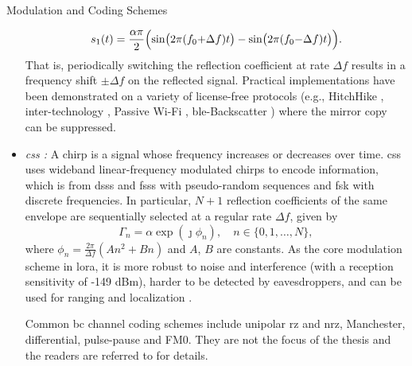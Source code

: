 \begin{section}{}
\begin{subsection}{Modulation and Coding Schemes}
\begin{itemize}
			\begin{equation}
				s_1(t) = \frac{\alpha \pi}{2} \Bigl(\sin\bigl(2 \pi (f_0 {+} \Delta f) t\bigr) - \sin\bigl(2 \pi (f_0 {-} \Delta f) t\bigr)\Bigr).
			\end{equation}
			That is, periodically switching the reflection coefficient at rate $\Delta f$ results in a frequency shift $\pm \Delta f$ on the reflected signal.
			Practical implementations have been demonstrated on a variety of license-free protocols (e.g., HitchHike \cite{Zhang2016a}, inter-technology \cite{Iyer2016}, Passive Wi-Fi \cite{Kellogg2017}, \gls{ble}-Backscatter \cite{Ensworth2017}) where the mirror copy can be suppressed.
			\item \emph{\gls{css} \cite{Talla2017}:} A chirp is a signal whose frequency increases or decreases over time.
			\gls{css} uses wideband linear-frequency modulated chirps to encode information, which is from \gls{dsss} and \gls{fsss} with pseudo-random sequences and \gls{fsk} with discrete frequencies.
			In particular, $N+1$ reflection coefficients of the same envelope are sequentially selected at a regular rate $\Delta f$, given by
			\begin{equation}
				\Gamma_n = \alpha \exp(\jmath \phi_n), \quad n \in \{0, 1, \ldots, N\},
			\end{equation}
			where $\phi_n = \frac{2 \pi}{\Delta f}(A n^2 + B n)$ and $A$, $B$ are constants.
			As the core modulation scheme in \gls{lora}, it is more robust to noise and interference (with a reception sensitivity of -149 dBm), harder to be detected by eavesdroppers, and can be used for ranging and localization \cite{Abbasi2021a}.

			Common \gls{bc} channel coding schemes include unipolar \gls{rz} and \gls{nrz}, Manchester, differential, pulse-pause and FM0.
			They are not the focus of the thesis and the readers are referred to \cite[Chapter 2.3]{Hoang2020} for details.
		\end{itemize}
	\end{subsection}


\end{section}
